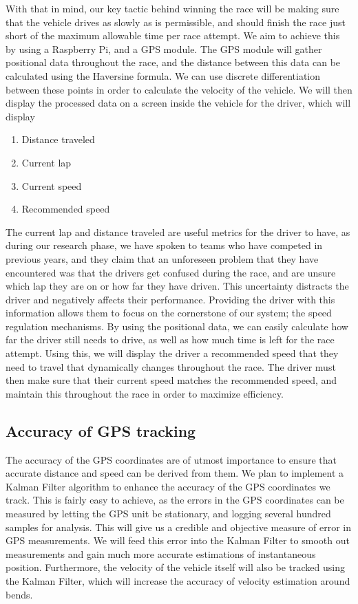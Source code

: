 \documentclass[a4paper, 12pt]{article}
\begin{document}
			With that in mind, our key tactic behind winning the race will be making sure that the vehicle drives as slowly as is permissible, and should finish the race just short of the maximum allowable time per race attempt. We aim to achieve this by using a Raspberry Pi, and a GPS module. The GPS module will gather positional data throughout the race, and the distance between this data can be calculated using the Haversine formula. We can use discrete differentiation between these points in order to calculate the velocity of the vehicle. We will then display the processed data on a screen inside the vehicle for the driver, which will display
			\begin{enumerate}
				\item Distance traveled
				\item Current lap
				\item Current speed
				\item Recommended speed
			\end{enumerate}

			The current lap and distance traveled are useful metrics for the driver to have, as during our research phase, we have spoken to teams who have competed in previous years, and they claim that an unforeseen problem that they have encountered was that the drivers get confused during the race, and are unsure which lap they are on or how far they have driven. This uncertainty distracts the driver and negatively affects their performance. Providing the driver with this information allows them to focus on the cornerstone of our system; the speed regulation mechanisms. By using the positional data, we can easily calculate how far the driver still needs to drive, as well as how much time is left for the race attempt. Using this, we will display the driver a recommended speed that they need to travel that dynamically changes throughout the race. The driver must then make sure that their current speed matches the recommended speed, and maintain this throughout the race in order to maximize efficiency.

		\subsection{Accuracy of GPS tracking} %
		\label{sub:accuracy_of_gps_tracking}
			The accuracy of the GPS coordinates are of utmost importance to ensure that accurate distance and speed can be derived from them. We plan to implement a Kalman Filter algorithm to enhance the accuracy of the GPS coordinates we track. This is fairly easy to achieve, as the errors in the GPS coordinates can be measured by letting the GPS unit be stationary, and logging several hundred samples for analysis. This will give us a credible and objective measure of error in GPS measurements. We will feed this error into the Kalman Filter to smooth out measurements and gain much more accurate estimations of instantaneous position. Furthermore, the velocity of the vehicle itself will also be tracked using the Kalman Filter, which will increase the accuracy of velocity estimation around bends.
\end{document}

